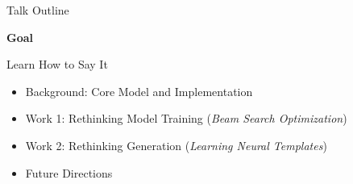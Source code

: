 
\begin{frame}{Talk Outline}
  \begin{center}
    \textbf{Goal}


    Learn How to Say It
  \end{center}
  \pause
  \air


  \begin{itemize}
  \item Background: Core Model and Implementation
    \air
  \item Work 1: Rethinking Model Training (\textit{Beam Search Optimization})
    \air

  \item Work 2: Rethinking  Generation  (\textit{Learning Neural Templates})
    \air

  \item Future Directions
  \end{itemize}
\end{frame}


